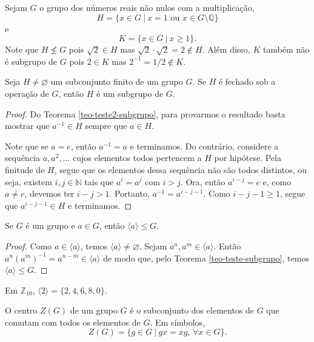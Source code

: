 %
\begin{example}
    Sejam $G$ o grupo dos números reais não nulos com a multiplicação, 
    \[
    H = \{ x\in G \ | \ x = 1 \text{ ou } x\in G\setminus\mathbb{Q} \}
    \]
    e
    \[
    K = \{ x\in G \ | \ x\geq 1 \}.
    \]
    Note que $H\not\leq G$ pois $\sqrt{2}\in H$ mas $\sqrt{2}\cdot\sqrt{2} = 2\notin H$.
    Além disso, $K$ também não é subgrupo de $G$ pois $2\in K$ mas $2^{-1} = 1/2 \notin K$.
\end{example}
%
\begin{theorem}
\label{teo-teste-subgrupo-finito}
    Seja $H\neq\varnothing$ um subconjunto finito de um grupo $G$. Se $H$ é fechado sob
    a operação de $G$, então $H$ é um subgrupo de $G$.
\end{theorem}
%
\begin{proof}
    Do Teorema \ref{teo-teste2-subgrupo}, para provarmos o resultado basta mostrar que
    $a^{-1}\in H$ sempre que $a\in H$.
    
    Note que se $a = e$, então $a^{-1} = a$ e terminamos. Do contrário, considere a
    sequência $a, a^2, \dots$ cujos elementos todos pertencem a $H$ por hipótese.
    Pela finitude de $H$, segue que os elementos dessa sequência não são todos distintos,
    ou seja, existem $i,j\in\mathbb{N}$ tais que $a^i = a^j$ com $i>j$. Ora, então
    $a^{i-j} = e$ e, como $a\neq e$, devemos ter $i-j>1$. Portanto, $a^{-1} = a^{i-j-1}$.
    Como $i-j-1\geq 1$, segue que $a^{i-j-1}\in H$ e terminamos.
\end{proof}
%
\begin{prop}
    Se $G$ é um grupo e $a\in G$, então $\langle a \rangle \leq G$.
\end{prop}
%
\begin{proof}
    Como $a\in\langle a \rangle$, temos $\langle a \rangle\neq\varnothing$. Sejam
    $a^n, a^m\in \langle a \rangle$. Então $a^n(a^m)^{-1} = a^{n-m}\in \langle a \rangle$ de modo que,
    pelo Teorema \ref{teo-teste-subgrupo}, temos $\langle a \rangle\leq G$.
\end{proof}
%
\begin{example}
    Em $\mathbb{Z}_{10}$, $\langle 2 \rangle = \{2, 4, 6, 8, 0\}$.
\end{example}
%
\begin{definition}[Centro]
\label{def-centro}
    O centro $Z(G)$ de um grupo $G$ é o subconjunto dos elementos de $G$ que comutam
    com todos os elementos de $G$. Em símbolos,
    \[
    Z(G) = \{ g\in G \ | \ gx = xg, \, \forall x\in G \}.
    \]
\end{definition}
